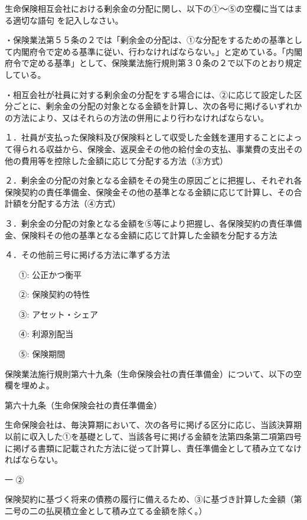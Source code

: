 \documentclass[report,gutter=10mm,fore-edge=10mm,uplatex,dvipdfmx]{jlreq}
\begin{document}

生命保険相互会社における剰余金の分配に関し、以下の①～⑤の空欄に当てはまる適切な語句
を記入しなさい。

・保険業法第５５条の２では「剰余金の分配は、①な分配をするための基準として内閣府令で定める基準に従い、行わなければならない。」と定めている。「内閣府令で定める基準」として、保険業法施行規則第３０条の２で以下のとおり規定している。

・相互会社が社員に対する剰余金の分配をする場合には、②に応じて設定した区分ごとに、剰余金の分配の対象となる金額を計算し、次の各号に掲げるいずれかの方法により、又はそれらの方法の併用により行わなければならない。

１．社員が支払った保険料及び保険料として収受した金銭を運用することによって得られる収益から、保険金、返戻金その他の給付金の支払、事業費の支出その他の費用等を控除した金額に応じて分配する方法（③方式）

２．剰余金の分配の対象となる金額をその発生の原因ごとに把握し、それぞれ各保険契約の責任準備金、保険金その他の基準となる金額に応じて計算し、その合計額を分配する方法（④方式）

３．剰余金の分配の対象となる金額を⑤等により把握し、各保険契約の責任準備金、保険料その他の基準となる金額に応じて計算した金額を分配する方法

４．その他前三号に掲げる方法に準ずる方法

\answer{}
\begin{itemize}
\item[ ①: ] 公正かつ衡平
\item[ ②: ] 保険契約の特性
\item[ ③: ] アセット・シェア
\item[ ④: ] 利源別配当
\item[ ⑤: ] 保険期間
\end{itemize}

保険業法施行規則第六十九条（生命保険会社の責任準備金）について、以下の空欄を埋めよ。

第六十九条（生命保険会社の責任準備金）

生命保険会社は、毎決算期において、次の各号に掲げる区分に応じ、当該決算期以前に収入した①を基礎として、当該各号に掲げる金額を法第四条第二項第四号に掲げる書類に記載された方法に従って計算し、責任準備金として積み立てなければならない。

一 ②

保険契約に基づく将来の債務の履行に備えるため、③に基づき計算した金額（第二号の二の払戻積立金として積み立てる金額を除く。）
\end{document}
